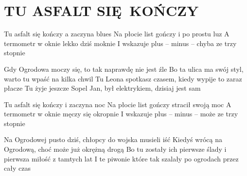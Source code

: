 \documentclass[../../../songbook.tex]{subfiles}
\begin{document}
\TabPositions{10cm} %
\section*{TU ASFALT SIĘ KOŃCZY}
{}
\vspace{0.5cm}
Tu asfalt się kończy a zaczyna blues 				 \newline
Na płocie list gończy i po prostu luz 				 \newline
A termometr w oknie lekko dziś moknie  				 \newline
I wskazuje plus – minus – chyba ze trzy stopnie		 \newline

Gdy Ogrodowa moczy się, to tak naprawdę nie jest źle			 \newline
Bo ta ulica ma swój styl, warto tu wpaść na kilka chwil 		 \newline
Tu Leona spotkasz czasem, kiedy wypije to zaraz płacze 			 \newline
Tu żyje jeszcze Sopel Jan, był elektrykiem, dzisiaj jest sam 	 \newline

Tu asfalt się kończy i zaczyna noc			 \newline
Na płocie list gończy stracił swoją moc			 \newline
A termometr w oknie męczy się okropnie			 \newline
I wskazuje plus – minus – może ze trzy stopnie			 \newline

Na Ogrodowej pusto dziś, chłopcy do wojska musieli iść			 \newline
Kiedyś wrócą na Ogrodową, choć może już okrężną drogą			 \newline
Bo tu zostały ich pierwsze ślady i pierwsza miłość z tamtych lat			 \newline
I te piwonie które tak szalały po ogrodach przez cały czas  \newline
\end{document}
